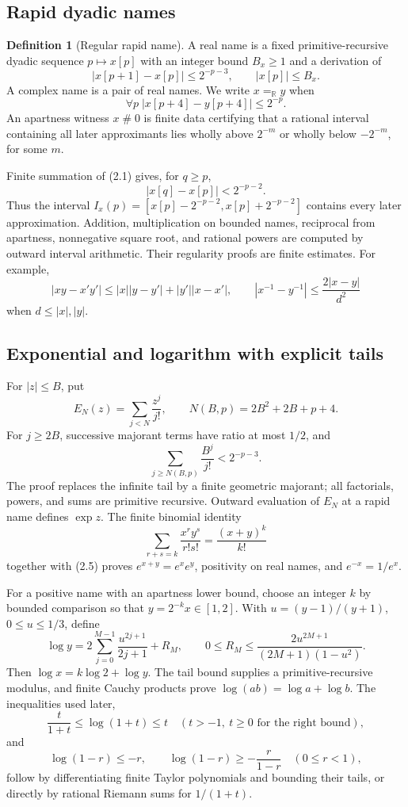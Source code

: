 \documentclass[11pt]{article}
\theoremstyle{definition}
\newtheorem{definition}[theorem]{Definition}
\newcommand{\R}{\mathbb R}
\newcommand{\abs}[1]{\left|#1\right|}
\newcommand{\apart}{\mathrel{\#}}
\begin{document}
\subsection{Rapid dyadic names}

\begin{definition}[Regular rapid name]\label{def:rapid}
A real name is a fixed primitive-recursive dyadic sequence
\(p\mapsto x[p]\) with an integer bound \(B_x\ge1\) and a derivation of
\[
 \abs{x[p+1]-x[p]}\le 2^{-p-3},\qquad \abs{x[p]}\le B_x.
 \tag{2.1}
\]
A complex name is a pair of real names.  We write \(x=_\R y\) when
\[
 \forall p\;\abs{x[p+4]-y[p+4]}\le2^{-p}.
 \tag{2.2}
\]
An apartness witness \(x\apart0\) is finite data certifying that a rational
interval containing all later approximants lies wholly above \(2^{-m}\) or
wholly below \(-2^{-m}\), for some \(m\).
\end{definition}

Finite summation of (2.1) gives, for \(q\ge p\),
\[
 \abs{x[q]-x[p]}<2^{-p-2}.
 \tag{2.3}
\]
Thus the interval \(I_x(p)=[x[p]-2^{-p-2},x[p]+2^{-p-2}]\) contains every
later approximation.  Addition, multiplication on bounded names, reciprocal
from apartness, nonnegative square root, and rational powers are computed by
outward interval arithmetic.  Their regularity proofs are finite estimates.
For example,
\[
 \abs{xy-x'y'}\le \abs{x}\abs{y-y'}+\abs{y'}\abs{x-x'},
 \qquad
 \abs{x^{-1}-y^{-1}}\le \frac{2\abs{x-y}}{d^2}
 \tag{2.4}
\]
when \(d\le\abs{x},\abs{y}\).

\subsection{Exponential and logarithm with explicit tails}

For \(\abs z\le B\), put
\[
 E_N(z)=\sum_{j<N}\frac{z^j}{j!},\qquad
 N(B,p)=2B^2+2B+p+4.
\]
For \(j\ge2B\), successive majorant terms have ratio at most \(1/2\), and
\[
 \sum_{j\ge N(B,p)}\frac{B^j}{j!}<2^{-p-3}.
 \tag{2.5}
\]
The proof replaces the infinite tail by a finite geometric majorant; all
factorials, powers, and sums are primitive recursive.  Outward evaluation of
\(E_N\) at a rapid name defines \(\exp z\).  The finite binomial identity
\[
 \sum_{r+s=k}\frac{x^r y^s}{r!s!}=\frac{(x+y)^k}{k!}
\]
together with (2.5) proves \(e^{x+y}=e^x e^y\), positivity on real names, and
\(e^{-x}=1/e^x\).

For a positive name with an apartness lower bound, choose an integer \(k\) by
bounded comparison so that \(y=2^{-k}x\in[1,2]\).  With
\(u=(y-1)/(y+1)\), \(0\le u\le1/3\), define
\[
 \log y=2\sum_{j=0}^{M-1}\frac{u^{2j+1}}{2j+1}+R_M,
 \qquad
 0\le R_M\le\frac{2u^{2M+1}}{(2M+1)(1-u^2)}.
 \tag{2.6}
\]
Then \(\log x=k\log2+\log y\).  The tail bound supplies a primitive-recursive
modulus, and finite Cauchy products prove \(\log(ab)=\log a+\log b\).  The
inequalities used later,
\[
 \frac{t}{1+t}\le\log(1+t)\le t\quad(t>-1,\ t\ge0\text{ for the right bound}),
 \tag{2.7}
\]
and
\[
 \log(1-r)\le-r,
 \qquad
 \log(1-r)\ge-\frac{r}{1-r}\quad(0\le r<1),
 \tag{2.8}
\]
follow by differentiating finite Taylor polynomials and bounding their tails,
or directly by rational Riemann sums for \(1/(1+t)\).
\end{document}

